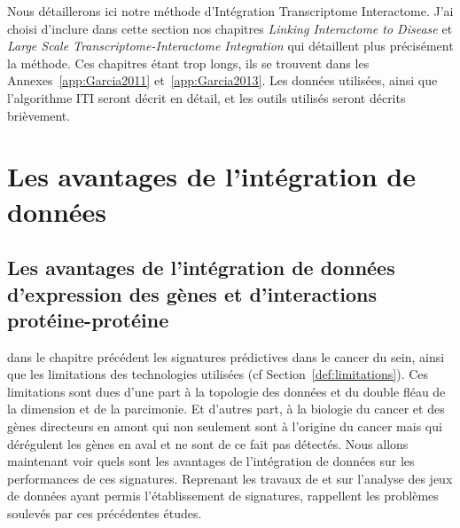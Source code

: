 \singlespacing

		\begin{center}
			\begin{tcolorbox}[colback=green!5!white,colframe=green!45!black,arc=0mm]
				\sffamily
				Nous détaillerons ici notre méthode d'Intégration Transcriptome Interactome. J'ai choisi d'inclure dans cette section nos chapitres \emph{Linking Interactome to Disease} \citep{Garcia2011} et \emph{Large Scale Transcriptome-Interactome Integration} \citep{Garcia2013} qui détaillent plus précisément la méthode. Ces chapitres étant trop longs, ils se trouvent dans les Annexes~\ref{app:Garcia2011} et~\ref{app:Garcia2013}. Les données utilisées, ainsi que l'algorithme ITI seront décrit en détail, et les outils utilisés seront décrits brièvement.
			\end{tcolorbox}
			\vspace{5ex}
			\minitoc
		\end{center}
		\newpage

\doublespacing

	\section{\textcolor{green!45!black}{Les avantages de l'intégration de données}}

		\subsection{\textcolor{green!45!black}{Les avantages de l'intégration de données d'expression des gènes et d'interactions protéine-protéine}}
			 dans le chapitre précédent les signatures prédictives dans le cancer du sein, ainsi que les limitations des technologies utilisées (cf Section~\ref{def:limitations}).
			Ces limitations sont dues d'une part à la topologie des données et du double fléau de la dimension et de la parcimonie.
			Et d'autres part, à la biologie du cancer et des gènes directeurs en amont qui non seulement sont à l'origine du cancer mais qui dérégulent les gènes en aval et ne sont de ce fait pas détectés.
			Nous allons maintenant voir quels sont les avantages de l'intégration de données sur les performances de ces signatures.
			Reprenant les travaux de \citeauthor{vandevijver2002} et \citeauthor{Wang2005} sur l'analyse des jeux de données ayant permis l'établissement de signatures, \citeauthor{Chuang2007} rappellent les problèmes soulevés par ces précédentes études.

